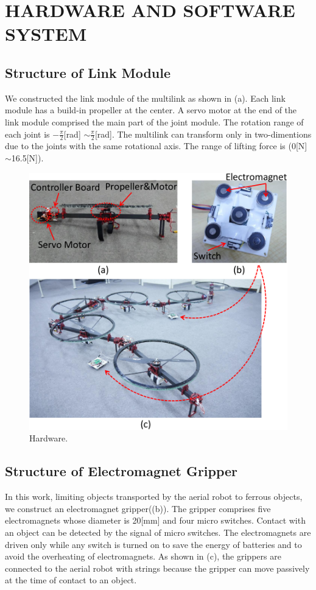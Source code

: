 \section{HARDWARE AND SOFTWARE SYSTEM}
\subsection{Structure of Link Module}
We constructed the link module of the multilink as shown in (a). Each link module has a build-in propeller at the center. A servo motor at the end of the link module comprised the main part of the joint module. The rotation range of each joint is $-\frac{\pi}{2}$[rad] $\sim \frac{\pi}{2}$[rad]. The multilink can transform only in two-dimentions due to the joints with the same rotational axis. The range of lifting force is (0[N]$\sim$16.5[N]). 
 \begin{figure}[t]
  \begin{center}
    \includegraphics[width=1.0\columnwidth]{figs/hardware.pdf}
  \end{center}
  \caption{Hardware.\label{figure:hardware}}
\end{figure}

\subsection{Structure of Electromagnet Gripper}
In this work, limiting objects transported by the aerial robot to ferrous objects, we construct an electromagnet gripper((b)). The gripper comprises five electromagnets whose diameter is 20[mm] and four micro switches. Contact with an object can be detected by the signal of micro switches. The electromagnets are driven only while any switch is turned on to save the energy of batteries and to avoid the overheating of electromagnets. As shown in (c), the grippers are connected to the aerial robot with strings because the gripper can move passively at the time of contact to an object.

